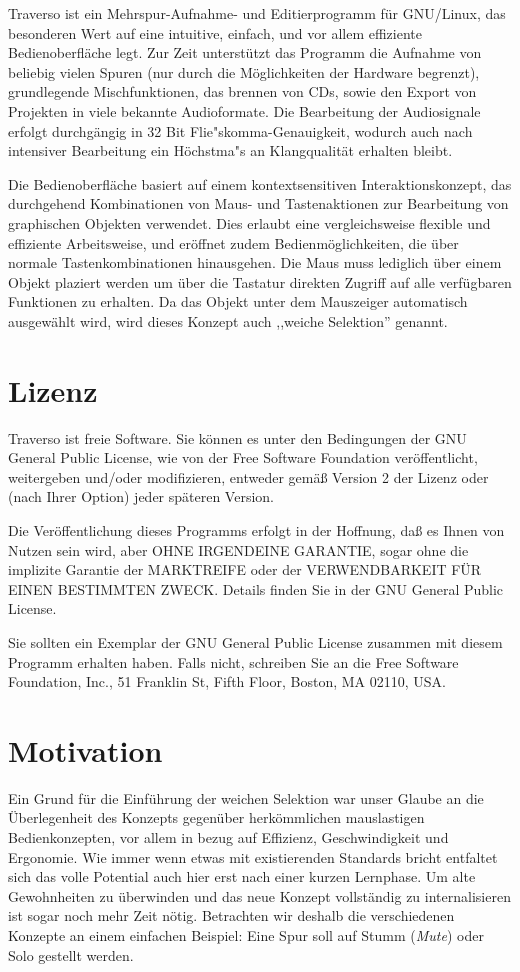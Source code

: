 Traverso ist ein Mehrspur-Aufnahme- und Editierprogramm für GNU/Linux, das besonderen Wert auf eine intuitive, einfach, und vor allem effiziente Bedienoberfläche legt. Zur Zeit unterstützt das Programm die Aufnahme von beliebig vielen Spuren (nur durch die Möglichkeiten der Hardware begrenzt), grundlegende Mischfunktionen, das brennen von CDs, sowie den Export von Projekten in viele bekannte Audioformate. Die Bearbeitung der Audiosignale erfolgt durchgängig in 32 Bit Flie"skomma-Genauigkeit, wodurch auch nach intensiver Bearbeitung ein Höchstma"s an Klangqualität erhalten bleibt.

Die Bedienoberfläche basiert auf einem kontextsensitiven Interaktionskonzept, das durchgehend Kombinationen von Maus- und Tastenaktionen zur Bearbeitung von graphischen Objekten verwendet. Dies erlaubt eine vergleichsweise flexible und effiziente Arbeitsweise, und eröffnet zudem Bedienmöglichkeiten, die über normale Tastenkombinationen hinausgehen. Die Maus muss lediglich über einem Objekt plaziert werden um über die Tastatur direkten Zugriff auf alle verfügbaren Funktionen zu erhalten. Da das Objekt unter dem Mauszeiger automatisch ausgewählt wird, wird dieses Konzept auch ,,weiche Selektion'' genannt.

\section{Lizenz}
Traverso ist freie Software. Sie können es unter den Bedingungen der GNU General Public License, wie von der Free Software Foundation veröffentlicht, weitergeben und/oder modifizieren, entweder gemäß Version 2 der Lizenz oder (nach Ihrer Option) jeder späteren Version. 

Die Veröffentlichung dieses Programms erfolgt in der Hoffnung, daß es Ihnen von Nutzen sein wird, aber OHNE IRGENDEINE GARANTIE, sogar ohne die implizite Garantie der MARKTREIFE oder der VERWENDBARKEIT FÜR EINEN BESTIMMTEN ZWECK. Details finden Sie in der GNU General Public License.

Sie sollten ein Exemplar der GNU General Public License zusammen mit diesem Programm erhalten haben. Falls nicht, schreiben Sie an die Free Software Foundation, Inc., 51 Franklin St, Fifth Floor, Boston, MA 02110, USA.

\section{Motivation}
Ein Grund für die Einführung der weichen Selektion war unser Glaube an die Überlegenheit des Konzepts gegenüber herkömmlichen mauslastigen Bedienkonzepten, vor allem in bezug auf Effizienz, Geschwindigkeit und Ergonomie. Wie immer wenn etwas mit existierenden Standards bricht entfaltet sich das volle Potential auch hier erst nach einer kurzen Lernphase. Um alte Gewohnheiten zu überwinden und das neue Konzept vollständig zu internalisieren ist sogar noch mehr Zeit nötig. Betrachten wir deshalb die verschiedenen Konzepte an einem einfachen Beispiel: Eine Spur soll auf Stumm (\textit{Mute}) oder Solo gestellt werden.

